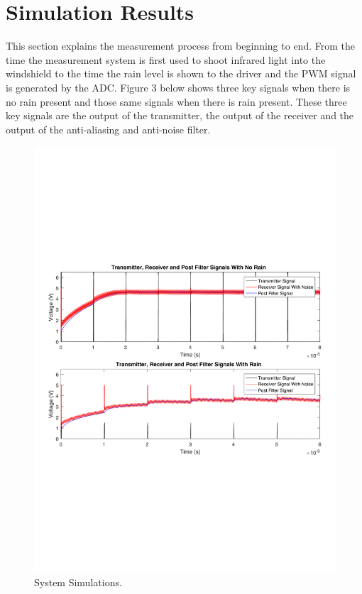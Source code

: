 \documentclass[conference, 11pt]{IEEEtran}
\begin{document}
\section{Simulation Results}
This section explains the measurement process from beginning to end. From the time the measurement system is first used to shoot infrared light into the windshield to the time the rain level is shown to the driver and the PWM signal is generated by the ADC. Figure 3 below shows three key signals when there is no rain present and those same signals when there is rain present. These three key signals are the output of the transmitter, the output of the receiver and the output of the anti-aliasing and anti-noise filter. 

 \begin{figure}[H]
 \centering 
 \includegraphics[width=\columnwidth]{RainVsNoRain}
 \centering 
  \caption {System Simulations. }
 \end{figure}
\end{document}
